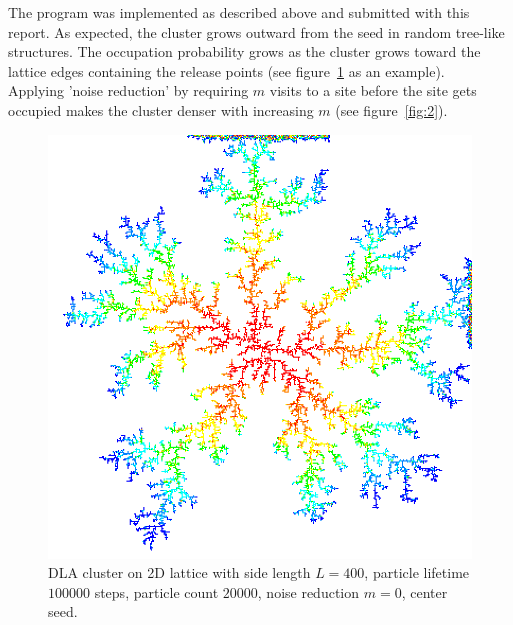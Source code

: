 \documentclass[11pt,a4paper]{article}
\begin{document}
The program was implemented as described above and submitted with this report. 
As expected, the cluster grows outward from the seed in random tree-like structures. The occupation probability grows 
as the cluster grows toward the lattice edges containing the release points (see figure~\ref{fig:1} as an example).\\

Applying 'noise reduction' by requiring $m$ visits to a site before the site gets occupied makes the cluster denser with
increasing $m$ (see figure~\ref{fig:2}).


\begin{figure}
\begin{center}
\includegraphics[scale=0.4]{fig_1.png} 
\end{center}
\caption{DLA cluster on 2D lattice with side length $L=400$, particle lifetime $100000$ steps, particle count $20000$, noise reduction $m=0$, center seed.}
\label{fig:1}
\end{figure}
\end{document}
